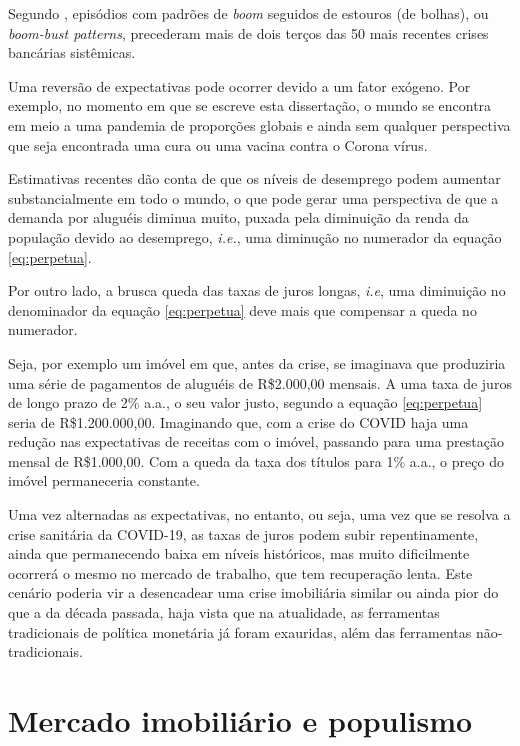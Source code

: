 \documentclass[
	12pt,				%
	oneside,			%
	a4paper,			%
	chapter=TITLE,		%
	section=TITLE,		%
	english,			%
	brazil				%
	]{abntex2}
\begin{document}
Segundo \textcite{fmiera}, episódios com padrões de \emph{boom} seguidos de estouros (de
bolhas), ou \emph{boom-bust patterns}, precederam mais de dois terços das 50 mais
recentes crises bancárias sistêmicas.

Uma reversão de expectativas pode ocorrer devido a um fator exógeno. Por exemplo,
no momento em que se escreve esta dissertação, o mundo se encontra em meio a
uma pandemia de proporções globais e ainda sem qualquer perspectiva que seja
encontrada uma cura ou uma vacina contra o Corona vírus.

Estimativas recentes dão conta de que os níveis de desemprego podem aumentar
substancialmente em todo o mundo, o que pode gerar uma perspectiva de que a
demanda por aluguéis diminua muito, puxada pela diminuição da renda da
população devido ao desemprego, \emph{i.e.}, uma diminução no numerador da equação
\eqref{eq:perpetua}.

Por outro lado, a brusca queda das taxas de juros longas, \emph{i.e}, uma diminuição
no denominador da equação \eqref{eq:perpetua} deve mais que compensar a queda no
numerador.

Seja, por exemplo um imóvel em que, antes da crise, se imaginava que produziria
uma série de pagamentos de aluguéis de R\$2.000,00 mensais. A uma taxa de juros
de longo prazo de 2\% a.a., o seu valor justo, segundo a equação
\eqref{eq:perpetua} seria de R\$1.200.000,00. Imaginando que, com a crise do COVID
haja uma redução nas expectativas de receitas com o imóvel, passando para uma
prestação mensal de R\$1.000,00. Com a queda da taxa dos títulos para 1\% a.a.,
o preço do imóvel permaneceria constante.

Uma vez alternadas as expectativas, no entanto, ou seja, uma vez que se resolva
a crise sanitária da COVID-19, as taxas de juros podem subir repentinamente,
ainda que permanecendo baixa em níveis históricos, mas muito dificilmente
ocorrerá o mesmo no mercado de trabalho, que tem recuperação lenta. Este cenário
poderia vir a desencadear uma crise imobiliária similar ou ainda pior do que a
da década passada, haja vista que na atualidade, as ferramentas tradicionais de
política monetária já foram exauridas, além das ferramentas não-tradicionais.

\hypertarget{mercado-imobiliuxe1rio-e-populismo}{%
\section{Mercado imobiliário e populismo}\label{mercado-imobiliuxe1rio-e-populismo}}
\end{document}
